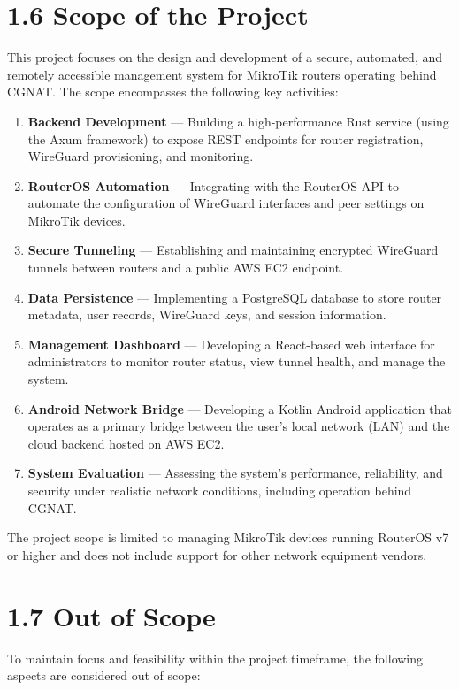 \documentclass[12pt,a4paper,oneside]{report}
\begin{document}
\section{1.6 Scope of the Project}

This project focuses on the design and development of a secure, automated, and remotely accessible management system for MikroTik routers operating behind CGNAT. The scope encompasses the following key activities:

\begin{enumerate}
  \item \textbf{Backend Development} --- Building a high-performance Rust service (using the Axum framework) to expose REST endpoints for router registration, WireGuard provisioning, and monitoring.
  \item \textbf{RouterOS Automation} --- Integrating with the RouterOS API to automate the configuration of WireGuard interfaces and peer settings on MikroTik devices.
  \item \textbf{Secure Tunneling} --- Establishing and maintaining encrypted WireGuard tunnels between routers and a public AWS EC2 endpoint.
  \item \textbf{Data Persistence} --- Implementing a PostgreSQL database to store router metadata, user records, WireGuard keys, and session information.
  \item \textbf{Management Dashboard} --- Developing a React-based web interface for administrators to monitor router status, view tunnel health, and manage the system.
  \item \textbf{Android Network Bridge} --- Developing a Kotlin Android application that operates as a primary bridge between the user's local network (LAN) and the cloud backend hosted on AWS EC2.
  \item \textbf{System Evaluation} --- Assessing the system's performance, reliability, and security under realistic network conditions, including operation behind CGNAT.
\end{enumerate}

The project scope is limited to managing MikroTik devices running RouterOS v7 or higher and does not include support for other network equipment vendors.

\section{1.7 Out of Scope}

To maintain focus and feasibility within the project timeframe, the following aspects are considered out of scope:
\end{document}
